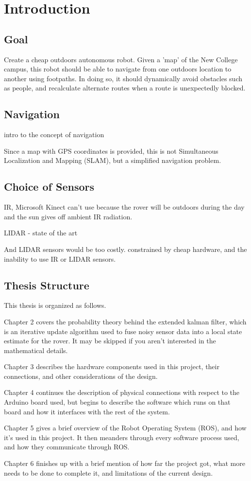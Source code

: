 \chapter{Introduction}

\section{Goal}
Create a cheap outdoors autonomous robot. Given a 'map' of the New College campus, this robot should be able to navigate from one outdoors location to another using footpaths. In doing so, it should dynamically avoid obstacles such as people, and recalculate alternate routes when a route is unexpectedly blocked.

\section{Navigation}
intro to the concept of navigation

Since a map with GPS coordinates is provided, this is not Simultaneous Localization and Mapping (SLAM), but a simplified navigation problem. 

\section{Choice of Sensors}
IR, Microsoft Kinect
can't use because the rover will be outdoors during the day and the sun gives off ambient IR radiation.

LIDAR - state of the art

And LIDAR sensors would be too costly. constrained by cheap hardware, and the inability to use IR or LIDAR sensors.

\section{Thesis Structure}
This thesis is organized as follows.

Chapter 2 covers the probability theory behind the extended kalman filter, which is an iterative update algorithm used to fuse noisy sensor data into a local state estimate for the rover. It may be skipped if you aren't interested in the mathematical details.

Chapter 3 describes the hardware components used in this project, their connections, and other considerations of the design.

Chapter 4 continues the description of physical connections with respect to the Arduino board used, but begins to describe the software which runs on that board and how it interfaces with the rest of the system.

Chapter 5 gives a brief overview of the Robot Operating System (ROS), and how it's used in this project. It then meanders through every software process used, and how they communicate through ROS.

Chapter 6 finishes up with a brief mention of how far the project got, what more needs to be done to complete it, and limitations of the current design.
